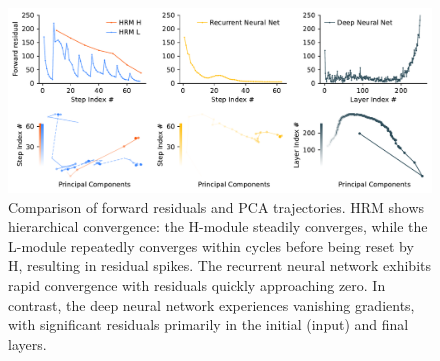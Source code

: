 \begin{figure}[t]
\centering
\includegraphics[width=\linewidth]{figures/forward_res/trajectory_plot.pdf}
\caption{Comparison of forward residuals and PCA trajectories. HRM shows hierarchical convergence: the H-module steadily converges, while the L-module repeatedly converges within cycles before being reset by H, resulting in residual spikes. The recurrent neural network exhibits rapid convergence with residuals quickly approaching zero. In contrast, the deep neural network experiences vanishing gradients, with significant residuals primarily in the initial (input) and final layers.}
\label{fig:forward-residual}
\end{figure}
